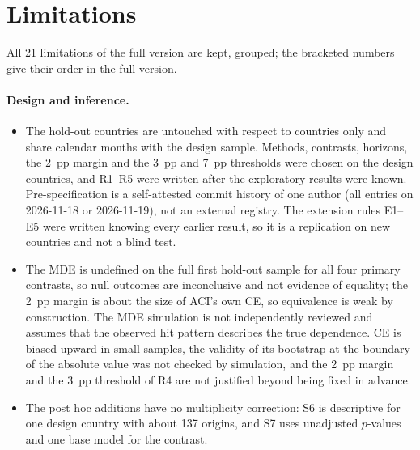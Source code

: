 \section{Limitations}\label{sec:limitations}

All 21 limitations of the full version are kept, grouped; the bracketed numbers give their order in the full version.

\paragraph{Design and inference.}
\begin{itemize}
\item[(1, 20)] The hold-out countries are untouched with respect to countries only and share calendar months with the design sample. Methods, contrasts, horizons, the 2~pp margin and the 3~pp and 7~pp thresholds were chosen on the design countries, and R1--R5 were written after the exploratory results were known. Pre-specification is a self-attested commit history of one author (all entries on 2026-11-18 or 2026-11-19), not an external registry. The extension rules E1--E5 were written knowing every earlier result, so it is a replication on new countries and not a blind test.
\item[(2, 9)] The MDE is undefined on the full first hold-out sample for all four primary contrasts, so null outcomes are inconclusive and not evidence of equality; the 2~pp margin is about the size of ACI's own CE, so equivalence is weak by construction. The MDE simulation is not independently reviewed and assumes that the observed hit pattern describes the true dependence. CE is biased upward in small samples, the validity of its bootstrap at the boundary of the absolute value was not checked by simulation, and the 2~pp margin and the 3~pp threshold of R4 are not justified beyond being fixed in advance.
\item[(15)] The post hoc additions have no multiplicity correction: S6 is descriptive for one design country with about 137 origins, and S7 uses unadjusted $p$-values and one base model for the contrast.
\end{itemize}


